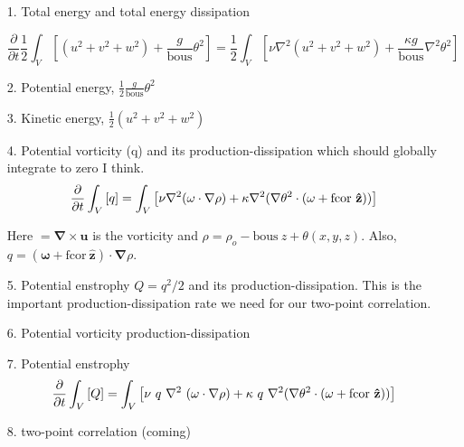 \documentclass[12pt]{article}
\begin{document}
\begin{itemize}
\item[1.] Total energy and total energy dissipation

\begin{equation}
\frac{\partial}{\partial t} \frac{1}{2} \int_V  
         \left[  (u^2 + v^2 + w^2) +\frac{g}{\text{bous}} 
           \theta^2\right]  
= \frac{1}{2}\int_V \left[  \nu \nabla^2 (u^2 + v^2 + w^2)  
                     + \frac{\kappa g}{\text{bous}} \nabla^2 \theta^2
                         \right] 
\end{equation}

\item[2.] Potential energy, $\frac{1}{2}\frac{g}{\text{bous}} \theta^2$

\item[3.] Kinetic energy, $\frac{1}{2} ( u^2 + v^2 + w^2 )$ 
  
\item[4.] Potential vorticity (q) and its production-dissipation which
  should globally integrate to zero I think.
  \begin{equation}
  \frac{\partial}{\partial t} \int_V  
           \left[ q \right] 
  = \int_V \left[ \nu \nabla^2 (\mathbf\omega \cdot \nabla \rho)  
                       + \kappa \nabla^2 (\nabla \theta^2 \cdot
                       (\mathbf\omega 
                       + \text{fcor} ~{\bf{\hat{z}}} )) 
                           \right] 
  \end{equation}
  
  Here $\mathbf = \mathbf\nabla \times \mathbf u$ is the vorticity and
  $\rho = \rho_o -\text{bous}~ z + \theta(x,y,z)$. Also, $q =
  (\mathbf\omega + \text{fcor}~\mathbf{\hat{z}}) \cdot \mathbf\nabla
  \rho.$

\item[5.] Potential enstrophy $Q = q^2/2$ and its
  production-dissipation. This is the important production-dissipation
  rate we need for our two-point correlation.

\item[6.] Potential vorticity production-dissipation

\item[7.] Potential enstrophy
  \begin{equation} 
    \frac{\partial}{\partial t} \int_V  
    \left[ Q \right]   
    = \int_V \left[ \nu  ~q ~\nabla^2 ~(\mathbf\omega \cdot \nabla \rho)  
      + \kappa  ~q ~\nabla^2 (\nabla \theta^2 \cdot 
      (\mathbf\omega  
      + \text{fcor} ~{\bf{\hat{z}}} ))  
    \right]  
  \end{equation} 

\item[8.] two-point correlation (coming)

\end{itemize}
\end{document}
